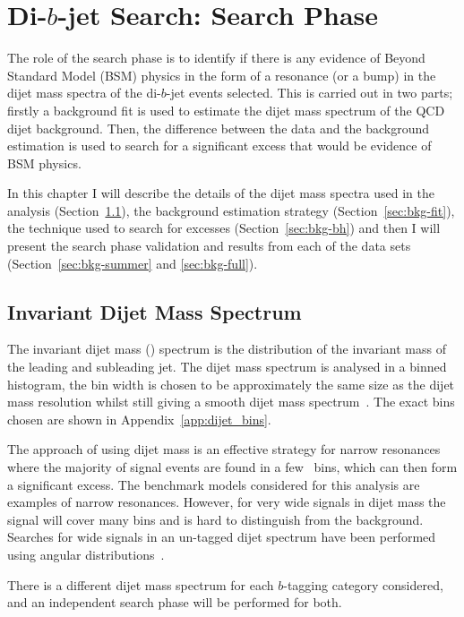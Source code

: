 \chapter{Di-$b$-jet Search: Search Phase}
\label{sec:bkg}

The role of the search phase is to identify if there is any evidence of Beyond Standard Model (BSM)
physics in the form of a resonance (or a bump) in the dijet mass spectra of the di-$b$-jet events selected.
This is carried out in two parts; firstly a background fit is used to estimate
the dijet mass spectrum of the QCD dijet background.
Then, the difference between the data and the background estimation is used 
to search for a significant excess that would be evidence of BSM physics.

In this chapter I will describe
the details of the dijet mass  spectra used in the analysis (Section~\ref{sec:bkg-mjj}),
the background estimation strategy (Section~\ref{sec:bkg-fit}),
the technique used to search for excesses (Section~\ref{sec:bkg-bh})
and then I will present the search phase validation and results from each of the data sets (Section~\ref{sec:bkg-summer} and \ref{sec:bkg-full}).

\section{Invariant Dijet Mass Spectrum}
\label{sec:bkg-mjj}

The invariant dijet mass (\mjj) spectrum
is the distribution of the invariant mass of the leading and subleading jet.
The dijet mass spectrum is analysed in a binned histogram,
the bin width is chosen to be approximately the same size as the dijet mass resolution
whilst still giving a smooth dijet mass spectrum~\cite{dijet-mori16_int}.
The exact bins chosen are shown in Appendix~\ref{app:dijet_bins}.

The approach of using dijet mass is an effective strategy for narrow resonances
where the majority of signal events are found in a few~\mjj{} bins,
which can then form a significant excess.
The benchmark models considered for this analysis are examples of narrow resonances.
However, for very wide signals in dijet mass the signal will cover many bins and is hard to distinguish from the background.
Searches for wide signals in an un-tagged dijet spectrum have been performed using angular distributions~\cite{dijet-mori16_paper}.

There is a different dijet mass spectrum for each
$b$-tagging category considered,
and an independent search phase will be performed for both.

